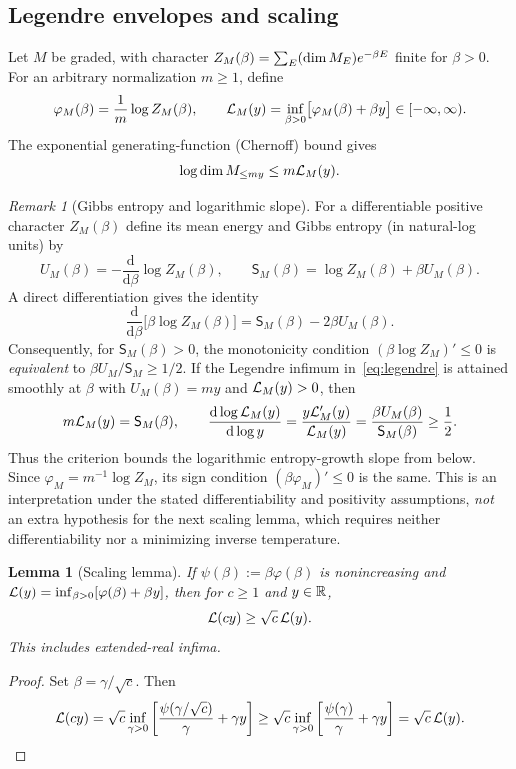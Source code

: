 \documentclass[10pt,a4paper]{article}
\numberwithin{equation}{section}
\newtheorem{lemma}[theorem]{Lemma}\newtheorem{proposition}[theorem]{Proposition}
\theoremstyle{remark}\newtheorem{remark}[theorem]{Remark}\newtheorem{question}[theorem]{Question}
\newcommand{\dd}{\mathrm d}
\begin{document}
\subsection{Legendre envelopes and scaling}
Let $M$ be graded, with character $Z_M(\beta)=\sum_E(\operatorname{dim} M_E)e^{-\beta E}$ finite for $\beta>0$. For an arbitrary normalization $m\ge1$, define
\begin{equation}\label{eq:legendre}
\varphi_M(\beta)=\frac1m\log Z_M(\beta),\qquad
\mathcal L_M(y)=\inf_{\beta>0}\bigl[\varphi_M(\beta)+\beta y\bigr]\in[-\infty,\infty).
\end{equation}
The exponential generating-function (Chernoff) bound gives
\begin{equation}\label{eq:chernoff}
\log\operatorname{dim} M_{\le my}\le m\mathcal L_M(y).
\end{equation}
\begin{remark}[Gibbs entropy and logarithmic slope]\label{rem:entropy-slope}
For a differentiable positive character $Z_M(\beta)$ define its mean energy and Gibbs entropy (in natural-log units) by
\[
U_M(\beta)=-\frac{\dd}{\dd\beta}\log Z_M(\beta),\qquad
\mathsf S_M(\beta)=\log Z_M(\beta)+\beta U_M(\beta).
\]
A direct differentiation gives the identity
\begin{equation}\label{eq:entropy-slope}
\frac{\dd}{\dd\beta}\bigl[\beta\log Z_M(\beta)\bigr]
=\mathsf S_M(\beta)-2\beta U_M(\beta).
\end{equation}
Consequently, for $\mathsf S_M(\beta)>0$, the monotonicity condition
$(\beta\log Z_M)'\le0$ is \emph{equivalent} to
$\beta U_M/\mathsf S_M\ge1/2$. If the Legendre infimum in~\eqref{eq:legendre} is attained smoothly at $\beta$ with $U_M(\beta)=my$ and $\mathcal L_M(y)>0$, then
\[
m\cB_M(y)=\mathsf S_M(\beta),\qquad
\frac{\dd\log\cB_M(y)}{\dd\log y}
=\frac{y\cB'_M(y)}{\cB_M(y)}
=\frac{\beta U_M(\beta)}{\mathsf S_M(\beta)}\ge\frac12.
\]
Thus the criterion bounds the logarithmic entropy-growth slope from below. Since $\varphi_M=m^{-1}\log Z_M$, its sign condition $(\beta\varphi_M)'\le0$ is the same. This is an interpretation under the stated differentiability and positivity assumptions, \emph{not} an extra hypothesis for the next scaling lemma, which requires neither differentiability nor a minimizing inverse temperature.
\end{remark}
\begin{lemma}[Scaling lemma]\label{lem:scaling}
If $\psi(\beta):=\beta\varphi(\beta)$ is nonincreasing and $\mathcal L(y)=\inf_{\beta>0}[\varphi(\beta)+\beta y]$, then for $c\ge1$ and $y\in\mathbb R$,
\begin{equation}\label{eq:scaling}\mathcal L(cy)\ge\sqrt c\,\mathcal L(y).\end{equation}
This includes extended-real infima.
\end{lemma}
\begin{proof}Set $\beta=\gamma/\sqrt c$. Then
\[
\mathcal L(cy)=\sqrt c\inf_{\gamma>0}\left[\frac{\psi(\gamma/\sqrt c)}\gamma+\gamma y\right]
\ge\sqrt c\inf_{\gamma>0}\left[\frac{\psi(\gamma)}\gamma+\gamma y\right]=\sqrt c\,\mathcal L(y).
\]\end{proof}
\end{document}
